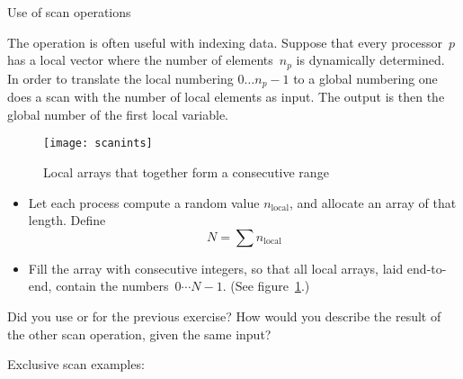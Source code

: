  {Use of scan operations}

The  operation is often useful with indexing data. Suppose that
every processor~$p$ has a local vector where the number of elements~$n_p$ is dynamically 
determined. In order to translate the local numbering $0\ldots n_p-1$ to a global numbering
one does a scan with the number of local elements as input. The output is then the global 
number of the first local variable.

\begin{figure}[ht]
  \texttt{[image: scanints]}
  \caption{Local arrays that together form a consecutive range}
  \label{fig:scanints}
\end{figure}

\begin{exercise}
  \label{ex:scanprint}
  \begin{itemize}
  \item Let each process compute a random value $n_{\scriptstyle\mathrm{local}}$,
    and allocate an array of that length.
    Define \[ N=\sum n_{\scriptstyle\mathrm{local}} \]
  \item Fill the array with consecutive integers, so that all local arrays,
    laid end-to-end,
    contain the numbers~$0\cdots N-1$. (See figure~\ref{fig:scanints}.)
  \end{itemize}
\end{exercise}

\begin{exercise}
  Did you use  or  for
  the previous exercise?
  How would you describe the result of the other scan operation, given the
  same input?
\end{exercise}

Exclusive scan examples:
%
%

